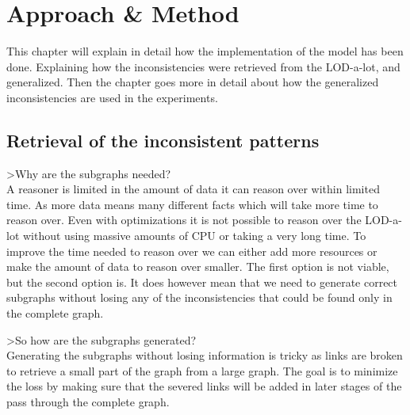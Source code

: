 \documentclass{article}
\begin{document}
\newpage
\section{Approach \& Method}
This chapter will explain in detail how the implementation of the model has been done. Explaining how the inconsistencies were retrieved from the LOD-a-lot, and generalized. Then the chapter goes more in detail about how the generalized inconsistencies are used in the experiments. 

\subsection{Retrieval of the inconsistent patterns}
>Why are the subgraphs needed?\\

A reasoner is limited in the amount of data it can reason over within limited time. As more data means many different facts which will take more time to reason over. Even with optimizations it is not possible to reason over the LOD-a-lot without using massive amounts of CPU or taking a very long time. To improve the time needed to reason over we can either add more resources or make the amount of data to reason over smaller. The first option is not viable, but the second option is. 
It does however mean that we need to generate correct subgraphs without losing any of the inconsistencies that could be found only in the complete graph.

>So how are the subgraphs generated?\\

Generating the subgraphs without losing information is tricky as links are broken to retrieve a small part of the graph from a large graph. The goal is to minimize the loss by making sure that the severed links will be added in later stages of the pass through the complete graph.
\end{document}
